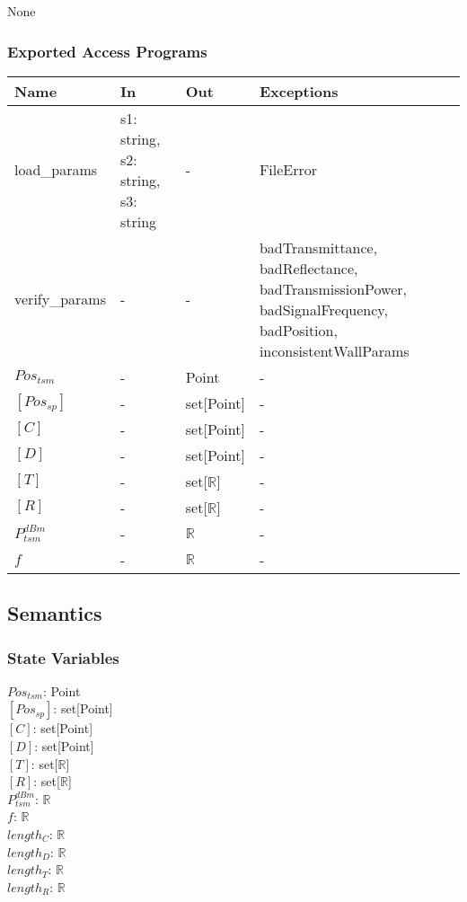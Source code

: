\documentclass[12pt, titlepage]{article}
\begin{document}
None

\subsubsection{Exported Access Programs}

\begin{center}
\begin{tabular}{p{4cm} p{2cm} p{2cm} p{4cm}}
\hline
\textbf{Name} & \textbf{In} & \textbf{Out} & \textbf{Exceptions} \\
\hline
load\_params & s1: string, s2: string, s3: string & - & FileError \\
verify\_params & - & - & badTransmittance, badReflectance, badTransmissionPower, badSignalFrequency, badPosition, inconsistentWallParams \\
$Pos_{tsm}$ & - & Point & - \\
$[Pos_{sp}]$ & - & set[Point] & - \\
$[C]$ & - & set[Point] & - \\
$[D]$ & - & set[Point] & - \\
$[T]$ & - & set[$\mathbb{R}$] & - \\
$[R]$ & - & set[$\mathbb{R}$] & - \\
$P_{tsm}^{dBm}$ & - & $\mathbb{R}$ & - \\
$f$ & - & $\mathbb{R}$ & - \\
\hline
\end{tabular}
\end{center}

\subsection{Semantics}

\subsubsection{State Variables}
$Pos_{tsm}$: Point\\
$[Pos_{sp}]$: set[Point]\\
$[C]$: set[Point]\\
$[D]$: set[Point]\\
$[T]$: set[$\mathbb{R}$]\\
$[R]$: set[$\mathbb{R}$]\\
$P_{tsm}^{dBm}$: $\mathbb{R}$\\
$f$: $\mathbb{R}$\\
$length_C$: $\mathbb{R}$\\
$length_D$: $\mathbb{R}$\\
$length_T$: $\mathbb{R}$\\
$length_R$: $\mathbb{R}$\\
\end{document}

